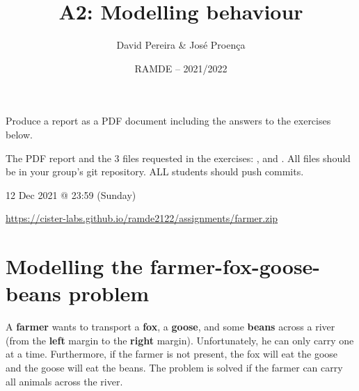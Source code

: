 \documentclass[11pt]{article}
\date{RAMDE -- 2021/2022}
\begin{document}
 
 
\title{A2: Modelling behaviour}

\author{David Pereira \& Jos\'{e} Proen\c{c}a} 


\maketitle

\vspace*{-2mm}
 Produce a report as a PDF document including the answers to the exercises below.

 The PDF report and the 3 files requested in the exercises: ,  and . All files should be in your group's git repository. ALL students should push commits.

 12 Dec 2021 @ 23:59 (Sunday) %

 \url{https://cister-labs.github.io/ramde2122/assignments/farmer.zip}


\section*{Modelling the farmer-fox-goose-beans problem}

A \textbf{farmer} wants to transport a \textbf{fox}, a \textbf{goose}, and some \textbf{beans} across a river (from the \textbf{left} margin to the \textbf{right} margin).
Unfortunately, he can only carry one at a time. Furthermore, if the farmer is not present, the fox will eat the goose and the goose will eat the beans. The problem is solved if the farmer can carry all animals across the river.

\vspace*{-3mm}

\end{document}

